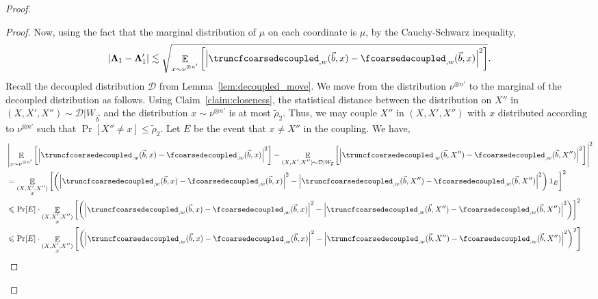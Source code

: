 \documentclass[11pt]{article}
\newcommand\card[1]{\left| {#1} \right|}
\newcommand\Expect[2]{{\mathop{\mathbb{E}}_{#1}\left[ {#2} \right]}}
\renewcommand\leq{\leqslant}
\newcommand{\V}[1]{{#1}}
\begin{document}
\begin{proof}
\begin{proof}
       Now, using the fact that the marginal distribution of $\mu$ on each coordinate is $\mu$, by the Cauchy-Schwarz inequality,
      \begin{equation}\label{eq:inv_trunc_bound}
        \card{\mathbf{\Lambda}_1 -  \mathbf{\Lambda}'_1 } \lesssim \sqrt{\Expect{\substack{\V x\sim \nu^{\otimes n'}}}{\card{\truncfcoarsedecoupled_{,\V w}(\vec{b},\V x) - \fcoarsedecoupled_{,\V w}(\vec{b},\V x) }^2}}.
      \end{equation}
      Recall the decoupled distribution $\mathcal{D}$ from Lemma~\ref{lem:decoupled_move}. We move from the distribution $\nu^{\otimes n'}$ to the marginal of the decoupled distribution as follows. Using Claim~\ref{claim:closeness}, the statistical distance between the distribution on $X''$ in $(X, X', X'')\sim \mathcal{D}|W_{\vec{b}}$ and the distribution $x\sim \nu^{\otimes n'}$ is at most $\tilde{\rho}_2$. Thus, we may couple $X''$ in $(X, X', X'')$ with $x$ distributed according to $\nu^{\otimes n'}$ such that $\Pr[X''\neq x]\leq \tilde{\rho}_2$. Let $E$ be the event that $x\neq X''$ in the coupling. We have,
      \begin{align*}
          &\card{\Expect{\substack{\V x\sim \nu^{\otimes n'}}}{\card{\truncfcoarsedecoupled_{,\V w}(\vec{b},\V x) - \fcoarsedecoupled_{,\V w}(\vec{b},\V x) }^2} -\Expect{\substack{(X, X', X'')\sim \mathcal{D}|W_{\vec{b}}}}{\card{\truncfcoarsedecoupled_{,\V w}(\vec{b},\V X'') - \fcoarsedecoupled_{,\V w}(\vec{b},\V X'') }^2} }^2\\
          & = \Expect{\substack{(X, X', X'')\\\V x }}{\left(\card{\truncfcoarsedecoupled_{,\V w}(\vec{b},\V x) - \fcoarsedecoupled_{,\V w}(\vec{b},\V x) }^2 -\card{\truncfcoarsedecoupled_{,\V w}(\vec{b},\V X'') - \fcoarsedecoupled_{,\V w}(\vec{b},\V X'') }^2\right) 1_E} ^2\\
          &\leq \Pr[E]\cdot \Expect{\substack{(X, X', X'')\\\V x }}{\left(\card{\truncfcoarsedecoupled_{,\V w}(\vec{b},\V x) - \fcoarsedecoupled_{,\V w}(\vec{b},\V x) }^2 -\card{\truncfcoarsedecoupled_{,\V w}(\vec{b},\V X'') - \fcoarsedecoupled_{,\V w}(\vec{b},\V X'') }^2\right)} ^2\\
           &\leq \Pr[E]\cdot \Expect{\substack{(X, X', X'')\\\V x }}{\left(\card{\truncfcoarsedecoupled_{,\V w}(\vec{b},\V x) - \fcoarsedecoupled_{,\V w}(\vec{b},\V x) }^2 -\card{\truncfcoarsedecoupled_{,\V w}(\vec{b},\V X'') - \fcoarsedecoupled_{,\V w}(\vec{b},\V X'') }^2\right)^2}\\

\end{align*}
\end{proof}
\end{proof}
\end{document}
